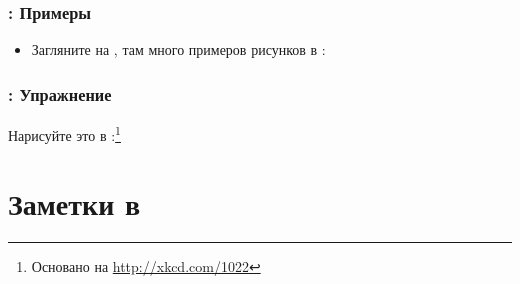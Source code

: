\documentclass[usenames,dvipsnames]{beamer}
\begin{document}
\begin{frame}[fragile]
\frametitle{\insertsection: Примеры}
\begin{itemize}
\item Загляните на , там
много примеров рисунков в \tikzname{}:
\end{itemize}
\begin{figure}
\hspace*{-4mm}%
\href{http://texample.net/tikz/examples/escher-brick-penrose-triangle/}{%
\scalebox{0.33}{}}%
\hspace*{-3mm}%
\href{http://texample.net/tikz/examples/computer-science-mindmap/}{%
\scalebox{0.35}{}}%
\href{http://texample.net/tikz/examples/gajski-kuhn-y-chart/}{%
\scalebox{0.4}{}}%
\end{figure}
\end{frame}

\begin{frame}[fragile]
\frametitle{\insertsection: Упражнение}
Нарисуйте это в \tikzname:\footnote{Основано на \url{http://xkcd.com/1022}}
\begin{figure}

\end{figure}
\end{frame}

\section{Заметки в \protect{}}
\end{document}
